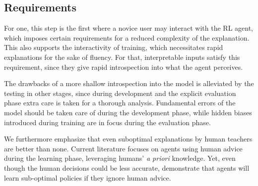 \documentclass[twoside,11pt]{article}
\begin{document}
\subsection{Requirements}
For one, this step is the first where a novice user may interact with the RL agent, which imposes certain requirements for a reduced complexity of the explanation. This also supports the interactivity of training, which necessitates rapid explanations for the sake of fluency. For that, interpretable inputs satisfy this requirement, since they give rapid introspection into what the agent perceives.

The drawbacks of a more shallow introspection into the model is alleviated by the testing in other stages, since during development and the explicit evaluation phase extra care is taken for a thorough analysis. Fundamental errors of the model should be taken care of during the development phase, while hidden biases introduced during training are in focus during the evaluation phase.

We furthermore emphasize that even suboptimal explanations by human teachers are better than none. Current literature focuses on agents using human advice during the learning phase, leveraging humans' \emph{a priori} knowledge. Yet, even though the human decisions could be less accurate, \citet{Zhang:2020:human_out_loop} demonstrate that agents will learn sub-optimal policies if they ignore human advice. 
\end{document}
